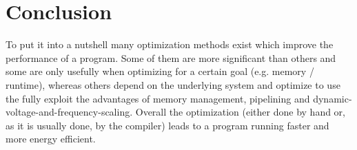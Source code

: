\documentclass[12pt, a4paper]{article}
\begin{document}
\section{Conclusion}
To put it into a nutshell many optimization methods exist which improve the performance of a program. Some of them are more significant than others and some are only usefully when optimizing for a certain goal (e.g. memory / runtime), whereas others depend on the underlying system and optimize to use the fully exploit the advantages of memory management, pipelining and dynamic-voltage-and-frequency-scaling. Overall the optimization (either done by hand or, as it is usually done, by the compiler) leads to a program running faster and more energy efficient. 


%
%
\end{document}
